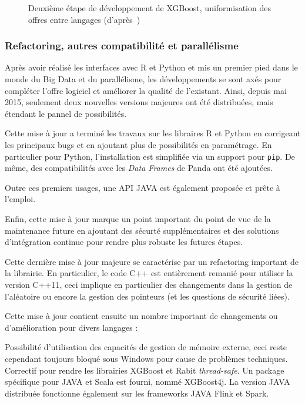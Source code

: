 \begin{figure}[h]
	\begin{margincap}
		\centering
	  	\resizebox{.98\textwidth}{!}{%
		}
		\caption{Deuxième étape de développement de XGBoost, uniformisation des offres entre langages (d'après~\cite{bib:xgboost-author})}
		\label{fig:dev_deux}
	\end{margincap}
\end{figure}

\subsubsection{Refactoring, autres compatibilité et parallélisme}
Après avoir réalisé les interfaces avec R et Python et mis un premier pied dans le monde du Big Data et du parallélisme, les développements se sont axés pour compléter l'offre logiciel et améliorer la qualité de l'existant. Ainsi, depuis mai 2015, seulement deux nouvelles versions majeures ont été distribuées, mais étendant le pannel de possibilités.

Cette mise à jour a terminé les travaux sur les libraires R et Python en corrigeant les principaux bugs et en ajoutant plus de possibilités en paramétrage. En particulier pour Python, l'installation est simplifiée via un support pour \texttt{pip}. De même, des compatibilités avec les \textit{Data Frames} de Panda ont été ajoutées.

Outre ces premiers usages, une API JAVA est également proposée et prête à l'emploi.

Enfin, cette mise à jour marque un point important du point de vue de la maintenance future en ajoutant des sécurté supplémentaires et des solutions d'intégration continue pour rendre plus robuste les futures étapes.

Cette dernière mise à jour majeure se caractérise par un refactoring important de la librairie. En particulier, le code C++ est entièrement remanié pour utiliser la version C++11, ceci implique en particulier des changements dans la gestion de l'aléatoire ou encore la gestion des pointeurs (et les questions de sécurité liées).

Cette mise à jour contient ensuite un nombre important de changements ou d'amélioration pour divers langages :
\begin{itemize}
	Possibilité d'utilisation des capacités de gestion de mémoire externe, ceci reste cependant toujours bloqué sous Windows pour cause de problèmes techniques.
	Correctif pour rendre les librairies XGBoost et Rabit \textit{thread-safe}.
	Un package spécifique pour JAVA et Scala est fourni, nommé XGBoost4j. La version JAVA distribuée fonctionne également sur les frameworks JAVA Flink et Spark.
\end{itemize}


